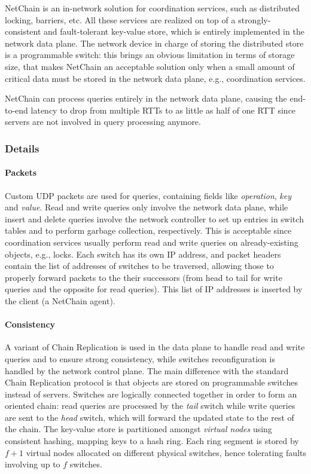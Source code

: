 NetChain \cite{netchain} is an in-network solution for coordination services, such as distributed locking, barriers, etc.
All these services are realized on top of a strongly-consistent and fault-tolerant key-value store, which is entirely implemented in the network data plane.
The network device in charge of storing the distributed store is a programmable switch: this brings an obvious limitation in terms of storage size, that makes NetChain \cite{netchain} an acceptable solution only when a small amount of critical data must be stored in the network data plane, e.g., coordination services.\par
NetChain \cite{netchain} can process queries entirely in the network data plane, causing the end-to-end latency to drop from multiple RTTs to as little as half of one RTT since servers are not involved in query processing anymore.

\subsubsection{Details}
\paragraph{Packets}
Custom UDP packets are used for queries, containing fields like \textit{operation}, \textit{key} and \textit{value}.
Read and write queries only involve the network data plane, while insert and delete queries involve the network controller to set up entries in switch tables and to perform garbage collection, respectively.
This is acceptable since coordination services usually perform read and write queries on already-existing objects, e.g., locks.
Each switch has its own IP address, and packet headers contain the list of addresses of switches to be traversed, allowing those to properly forward packets to the their successors (from head to tail for write queries and the opposite for read queries).
This list of IP addresses is inserted by the client (a NetChain \cite{netchain} agent).
\paragraph{Consistency}
A variant of Chain Replication \cite{chainreplication} is used in the data plane to handle read and write queries and to ensure strong consistency, while switches reconfiguration is handled by the network control plane.
The main difference with the standard Chain Replication \cite{chainreplication} protocol is that objects are stored on programmable switches instead of servers.
Switches are logically connected together in order to form an oriented chain: read queries are processed by the \textit{tail} switch while write queries are sent to the \textit{head} switch, which will forward the updated state to the rest of the chain.
The key-value store is partitioned amongst \textit{virtual nodes} using consistent hashing, mapping keys to a hash ring.
Each ring segment is stored by $f + 1$ virtual nodes allocated on different physical switches, hence tolerating faults involving up to $f$ switches.

